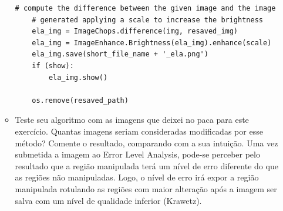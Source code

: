 \documentclass[12pt]{article}
\begin{document}
\begin{itemize}
\begin{itemize}
\begin{lstlisting}[basicstyle=\ttfamily]
    # compute the difference between the given image and the image
    # generated applying a scale to increase the brightness
    ela_img = ImageChops.difference(img, resaved_img)
    ela_img = ImageEnhance.Brightness(ela_img).enhance(scale)
    ela_img.save(short_file_name + '_ela.png')
    if (show):
        ela_img.show()
    
    os.remove(resaved_path)
\end{lstlisting}

\item Teste seu algoritmo com as imagens que deixei no paca para este exercício. 
Quantas imagens seriam consideradas modificadas por esse método? Comente o resultado,
comparando com a sua intuição.
Uma vez submetida a imagem ao Error Level Analysis, pode-se perceber pelo resultado que 
a região manipulada terá um nível de erro diferente do que as regiões não manipuladas. Logo, 
o nível de erro irá expor a região manipulada rotulando as regiões com maior alteração após
a imagem ser salva com um nível de qualidade inferior (Krawetz).


\end{itemize}
\end{itemize}
\end{document}
